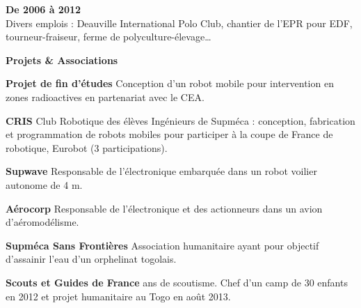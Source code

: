 \documentclass[a4paper,11pt,final]{memoir}
\newcommand{\Sep}{\vspace{1.5em}}
\newcommand{\SmallSep}{\vspace{0.5em}}
\newcommand{\CVSection}[1]
	{\Large\textbf{#1}\par
	\SmallSep\normalsize\normalfont}
\newcommand{\CVItem}[1]
	{\textbf{\color{RoyalBlue} #1}\normalsize\normalfont}
\begin{document}
\CVItem{De 2006 à 2012}\\
Divers emplois : Deauville International Polo Club, chantier de l'EPR pour EDF, tourneur-fraiseur, ferme de polyculture-élevage\ldots
\Sep

\CVSection{Projets \& Associations}
\CVItem{Projet de fin d'études} Conception d'un robot mobile pour intervention en zones radioactives en partenariat avec le CEA.
\SmallSep

\CVItem{CRIS}
Club Robotique des élèves Ingénieurs de Supméca : conception, fabrication et programmation de robots mobiles pour participer à la coupe de France de robotique, Eurobot (3 participations).
\SmallSep

\CVItem{Supwave}
Responsable de l'électronique embarquée dans un robot voilier autonome de 4 m.
\SmallSep

\CVItem{Aérocorp}
Responsable de l'électronique et des actionneurs dans un avion d'aéromodélisme.
\SmallSep

\CVItem{Supméca Sans Frontières}
Association humanitaire ayant pour objectif d'assainir l'eau d'un orphelinat togolais.
\SmallSep

\CVItem{Scouts et Guides de France}
8 ans de scoutisme. Chef d'un camp de 30 enfants en 2012 et projet humanitaire au Togo en août 2013.

\end{document}

